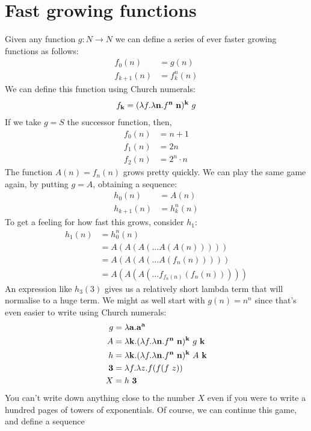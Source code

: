 \section{Fast growing functions}
Given any function $g : N \to N$ we can define a series of ever faster growing functions as follows:
\begin{align*}
  f_0(n) &= g(n)\\
  f_{k+1}(n) &= f^n_k(n)
\end{align*}
We can define this function using Church numerals:
\begin{align*}
  f_{\mathbf{k}} = (\lambda f. \lambda \mathbf{n}. f^{\mathbf{n}}\ \mathbf{n})^{\mathbf{k}}\ g
\end{align*}
If we take $g = S$ the successor function, then,
\begin{align*}
  f_0(n) &= n+1\\
  f_1(n) &= 2n\\
  f_2(n) &= 2^n \cdot n
\end{align*}
The function $A(n) = f_n(n)$ grows pretty quickly. We can play the same game again, by putting $g = A$, obtaining a sequence:
\begin{align*}
  h_0(n) &= A(n)\\
  h_{k+1}(n) &= h^n_k(n)
\end{align*}
To get a feeling for how fast this grows, consider $h_1$:
\begin{align*}
  h_1(n) &= h_0^n(n)\\
         &= A(A(A(\dots A(A(n)))))\\
         &= A(A(A(\dots A(f_n(n)))))\\
         &= A(A(A(\dots f_{f_n(n)}(f_n(n)))))
\end{align*}
An expression like $h_3(3)$ gives us a relatively short lambda term that will normalise to a huge term. We might as well start with $g(n) = n^n$ since that's even easier to write using Church numerals:
\begin{align*}
  g &= \lambda \ch{a}. \ch{a}^\ch{a}\\
  A &= \lambda \ch{k}. (\lambda f. \lambda \ch{n}. f^\ch{n}\ \ch{n})^\ch{k}\ g\ \ch{k}\\
  h &= \lambda \ch{k}. (\lambda f. \lambda \ch{n}. f^\ch{n}\ \ch{n})^\ch{k}\ A\ \ch{k}\\
  \ch{3} &= \lambda f. \lambda z. f (f (f\ z))\\
  X &= h\ \ch{3}
\end{align*}
You can't write down anything close to the number $X$ even if you were to write a hundred pages of towers of exponentials. Of course, we can continue this game, and define a sequence
